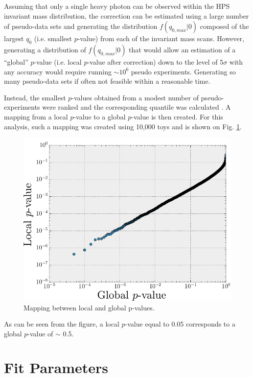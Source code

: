 Assuming that only a single heavy photon can be observed within the HPS invariant
mass distribution, the correction can be estimated using a large number
of pseudo-data sets and generating the distribution 
$f(q_{0, max} | 0)$ composed of the largest $q_{0}$ (i.e. smallest $p$-value)
from each of the invariant mass scans.
However, generating a distribution of $f(q_{0, max} | 0)$ that would allow 
an estimation of a ``global''  
$p$-value (i.e. local $p$-value after correction) down to the level of 5$\sigma$ with any accuracy would 
require running $\sim 10^{6}$ pseudo experiments.  Generating so many pseudo-data 
sets if often not feasible within a reasonable time. 

Instead, the smallest
$p$-values obtained from a modest number of pseudo-experiments were
ranked and the corresponding quantile was calculated \cite{Gross:2010qma}.  
A mapping from a local 
$p$-value to a global $p$-value is then created.  For this analysis, such a mapping
was created using 10,000 toys and is shown on Fig. \ref{fig:global_p_value}.  
\begin{figure}[t]
    \centering
    \includegraphics[width=.8\textwidth]{images/global_p_value_map.png}
    \caption{Mapping between local and global p-values.}
    \label{fig:global_p_value}
\end{figure}
As can be seen from the figure, a 
local $p$-value equal to 0.05 corresponds to a global $p$-value of $\sim$ 0.5.

\section{Fit Parameters}

